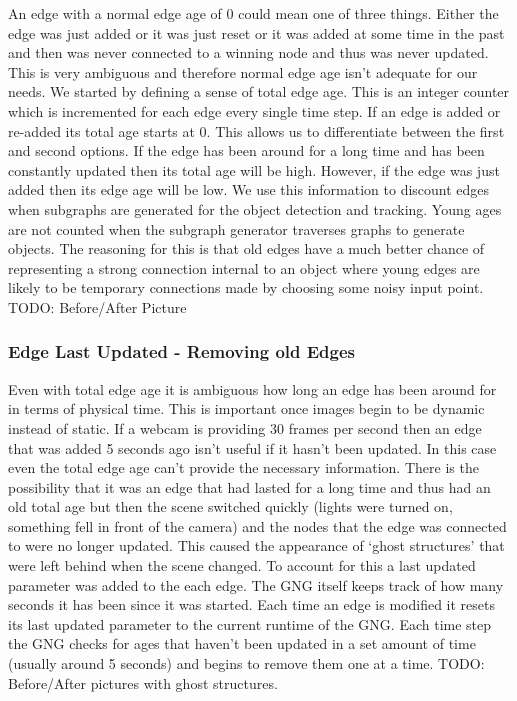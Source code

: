 \documentclass{article}
\renewcommand{\|}{\origbar} %
\begin{document}
An edge with a normal edge age of 0 could mean one of three things. Either the edge was just added or it was just reset or it was added at some time in the past and then was never connected to a winning node and thus was never updated. This is very ambiguous and therefore normal edge age isn't adequate for our needs. We started by defining a sense of total edge age. This is an integer counter which is incremented for each edge every single time step. If an edge is added or re-added its total age starts at 0. This allows us to differentiate between the first and second options. If the edge has been around for a long time and has been constantly updated then its total age will be high. However, if the edge was just added then its edge age will be low. We use this information to discount edges when subgraphs are generated for the object detection and tracking. Young ages are not counted when the subgraph generator traverses graphs to generate objects. The reasoning for this is that old edges have a much better chance of representing a strong connection internal to an object where young edges are likely to be temporary connections made by choosing some noisy input point. TODO: Before/After Picture

\subsubsection{Edge Last Updated - Removing old Edges}

Even with total edge age it is ambiguous how long an edge has been around for in terms of physical time. This is important once images begin to be dynamic instead of static. If a webcam is providing 30 frames per second then an edge that was added 5 seconds ago isn't useful if it hasn't been updated. In this case even the total edge age can't provide the necessary information. There is the possibility that it was an edge that had lasted for a long time and thus had an old total age but then the scene switched quickly (lights were turned on, something fell in front of the camera) and the nodes that the edge was connected to were no longer updated. This caused the appearance of `ghost structures' that were left behind when the scene changed. To account for this a last updated parameter was added to the each edge. The GNG itself keeps track of how many seconds it has been since it was started. Each time an edge is modified it resets its last updated parameter to the current runtime of the GNG. Each time step the GNG checks for ages that haven't been updated in a set amount of time (usually around 5 seconds) and begins to remove them one at a time. TODO: Before/After pictures with ghost structures.
\end{document}
